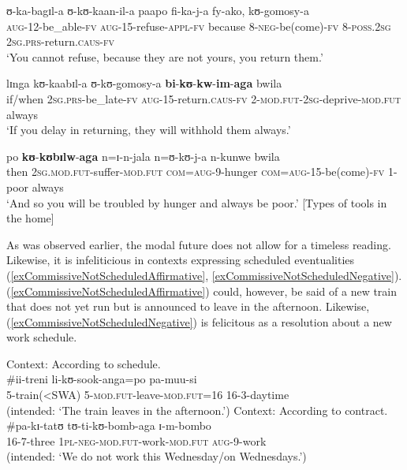 \begin{exe}
\begin{xlist}
\ex \label{exCommissiveSequenceConsequenceSentence5}
\gll ʊ-ka-bagɪl-a ʊ-kʊ-kaan-il-a paapo fi-ka-j-a fy-ako, kʊ-gomosy-a\\
\textsc{aug}-12-be\_able-\textsc{fv} \textsc{aug}-15-refuse-\textsc{appl}-\textsc{fv} because 8-\textsc{neg}-be(come)-\textsc{fv} 8-\textsc{poss.2sg} \textsc{2sg.prs}-return.\textsc{caus}-\textsc{fv}\\
\glt \lq You cannot refuse, because they are not yours, you return them.'

\ex \label{exCommissiveSequenceConsequenceSentence6}
\gll lɪnga kʊ-kaabɪl-a ʊ-kʊ-gomosy-a \textbf{bi}-\textbf{kʊ}-\textbf{kw}-\textbf{im}-\textbf{aga} bwila\\
if/when \textsc{2sg.prs}-be\_late-\textsc{fv} \textsc{aug}-15-return.\textsc{caus}-\textsc{fv} 2-\textsc{mod.fut}-\textsc{2sg}-deprive-\textsc{mod.fut} always\\
\glt \lq If you delay in returning, they will withhold them always.'

\ex \label{exCommissiveSequenceConsequenceSentence7} \gll po \textbf{kʊ}-\textbf{kʊbɪlw}-\textbf{aga} n=ɪ-n-jala n=ʊ-kʊ-j-a n-kunwe bwila\\
then \textsc{2sg.mod.fut}-suffer-\textsc{mod.fut} \textsc{com}=\textsc{aug}-9-hunger \textsc{com}=\textsc{aug}-15-be(come)-\textsc{fv} 1-poor always\\
\glt \lq And so you will be troubled by hunger and always be poor.'
[Types of tools in the home]
\end{xlist}
\end{exe}

As was observed earlier, the modal future does not allow for a timeless reading. Likewise, it is infeliticious in contexts expressing scheduled eventualities (\ref{exCommissiveNotScheduledAffirmative}, \ref{exCommissiveNotScheduledNegative}). (\ref{exCommissiveNotScheduledAffirmative}) could, however, be said of a new train that does not yet run but is announced to leave in the afternoon. Likewise, (\ref{exCommissiveNotScheduledNegative}) is felicitous as a resolution about a new work schedule.

\begin{exe}
\ex\label{exCommissiveNotScheduledAffirmative}Context: According to schedule.\\
\gll \#ii-treni li-kʊ-sook-anga=po pa-muu-si\\
\phantom{\#}5-train(<SWA) 5-\textsc{mod.fut}-leave-\textsc{mod.fut}=16 16-3-daytime\\
\glt \makebox[\myl][l]{}(intended: \lq The train leaves in the afternoon.')
\ex\label{exCommissiveNotScheduledNegative}Context: According to contract.\\
\gll \#pa-kɪ-tatʊ tʊ-ti-kʊ-bomb-aga ɪ-m-bombo\\
\phantom{\#}16-7-three \textsc{1pl}-\textsc{neg}-\textsc{mod.fut}-work-\textsc{mod.fut} \textsc{aug}-9-work\\
\glt \makebox[\myl][l]{}(intended: \lq We do not work this Wednesday/on Wednesdays.')
\end{exe}

